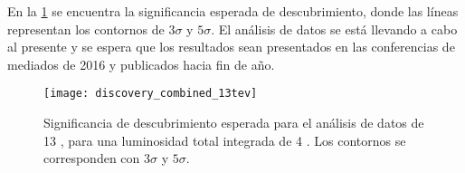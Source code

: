 En la \cref{fig:13tev_discovery} se encuentra la significancia esperada de descubrimiento,
donde las líneas representan los contornos de $3\sigma$ y $5\sigma$.
El análisis de datos se está llevando a cabo al presente y se espera que los resultados
sean presentados en las conferencias de mediados de 2016 y publicados hacia fin de a\~no.

\begin{figure}[!p]
  \centering

  \texttt{[image: discovery\_combined\_13tev]}

  \caption{Significancia de descubrimiento esperada para el análisis de datos de 13 \tev,
    para una luminosidad total integrada de 4 \ifb. Los contornos se corresponden con $3\sigma$ y $5\sigma$.}
  \label{fig:13tev_discovery}

\end{figure}
